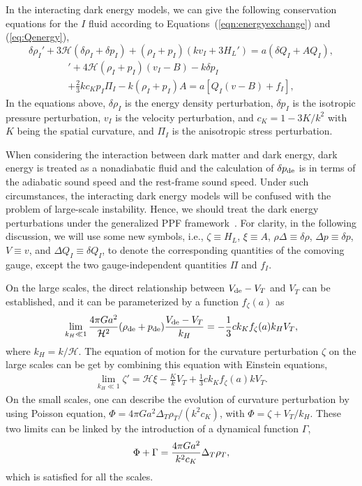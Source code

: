 \documentclass[aps,prd,nofootinbib,amsmath,amssymb,superscriptaddress,twocolumn,10pt]{revtex4}%
\newcommand{\ck}{c_K}
\begin{document}
In the interacting dark energy models, we can give the following conservation equations for the $I$ fluid according to Equations~(\ref{eqn:energyexchange}) and (\ref{eq:Qenergy}),
\begin{equation}
 {\delta\rho_I'}
	+  3\mathcal{H}({\delta \rho_I}+ {\delta p_I})+(\rho_I+p_I)(k{v}_I + 3 H_L')=a(\delta Q_I+AQ_I),\label{eqn:conservation1}
\end{equation}	
\begin{align}	
[(\rho_{I}+p_{I})(v_{I}-B)]'+4\mathcal{H}(\rho_I + p_I)({{v_I}-{B}})-k{ \delta p_I }\nonumber \\
+\frac{2}{3}kc_{K} p_I {\Pi_I}- k(\rho_I+ p_I) {A}=a[Q_I(v-B)+f_I],\label{eqn:conservation2}
\end{align}
In the equations above, $\delta\rho_I$ is the energy density perturbation, $\delta p_I$ is the isotropic pressure perturbation, $v_I$ is the velocity perturbation, and $c_K = 1-3K/k^2$ with $K$ being the spatial curvature, and $\Pi_I$ is the anisotropic stress perturbation.

When considering the interaction between dark matter and dark energy, dark energy is treated as a nonadiabatic fluid and the calculation of $\delta p_{\rm de}$ is in terms of the adiabatic sound speed and the rest-frame sound speed. Under such circumstances, the interacting dark energy models will be confused with the problem of large-scale instability. Hence, we should treat the dark energy perturbations under the generalized PPF framework~\cite{Li:2014eha}. For clarity, in the following discussion, we will use some new symbols, i.e., $\zeta\equiv H_L$, $\xi\equiv A$, $\rho\Delta\equiv\delta\rho$, $\Delta p\equiv\delta p$, $V\equiv v$, and $\Delta Q_I\equiv\delta Q_I$, to denote the corresponding quantities of the comoving gauge, except the two gauge-independent quantities $\Pi$ and $f_I$.

On the large scales, the direct relationship between $V_{\rm de} - V_T$ and $V_T$ can be established, and it can be parameterized by a function $f_\zeta(a)$ as \cite{Hu:2008zd,Fang:2008sn}
\begin{equation}
\lim_{k_H \ll 1}\frac{4\pi G a^2}{\mathcal{H}^2}(\rho_{\rm de} + p_{\rm de})\frac{V_{\rm de} - V_T}{k_H}=-\frac{1}{3}ck_{K} f_\zeta(a) k_H V_T,\label{eq:DEcondition}
\end{equation}
where $k_H=k/\mathcal{H}$. The equation of motion for the curvature perturbation $\zeta$ on the large scales can be get by combining this equation with Einstein equations,
\begin{align}
\lim_{k_H \ll 1} \zeta'  = \mathcal{H}\xi - \frac{K}{k} V_T +\frac{1}{3} ck_{K}  f_\zeta(a) k V_T.
\label{eqn:zetaprimesh}
\end{align}
On the small scales, one can describe the evolution of curvature perturbation by using Poisson equation, $\Phi=4\pi G a^2\Delta_T \rho_T/( k^2\ck)$, with $\Phi=\zeta+V_T/k_H$. These two limits can be linked by the introduction of a dynamical function $\Gamma$,
\begin{equation}
\Phi+\Gamma = {4\pi Ga^2
\over  k^2\ck} \Delta_T \rho_T,
\label{eqn:modpoiss}
\end{equation}
which is satisfied for all the scales.
\end{document}
